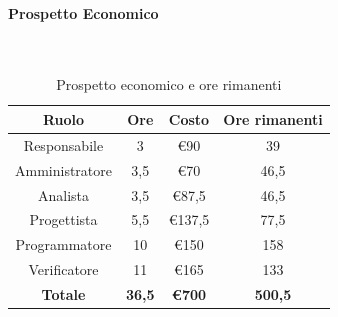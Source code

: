 \documentclass{article}
\begin{document}
                \paragraph{Prospetto Economico}\mbox{}\\
                \begin{table}[H]
                    \centering
                    \begin{tabular}{|c|c|c|c|}
                    \hline
                    \textbf{Ruolo}  & \textbf{Ore}  & \textbf{Costo} & \textbf{Ore rimanenti} \\ \hline
                    Responsabile    & 3             & €90            & 39                     \\ \hline
                    Amministratore  & 3,5           & €70            & 46,5                   \\ \hline
                    Analista        & 3,5           & €87,5          & 46,5                   \\ \hline
                    Progettista     & 5,5           & €137,5         & 77,5                   \\ \hline
                    Programmatore   & 10            & €150           & 158                    \\ \hline
                    Verificatore    & 11            & €165           & 133                    \\ \hline
                    \textbf{Totale} & \textbf{36,5} & \textbf{\euro700}   & \textbf{500,5}         \\ \hline
                    \end{tabular}
                    \caption{Prospetto economico e ore rimanenti}
                \end{table}
\end{document}
